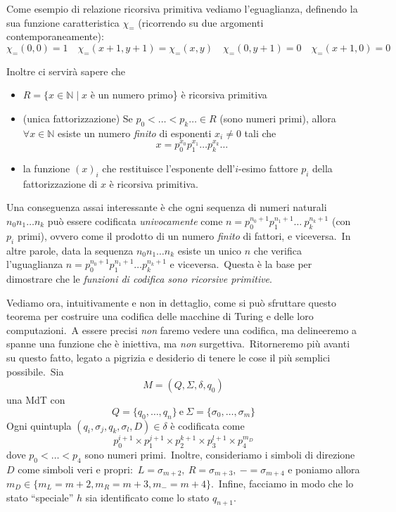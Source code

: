 \noindent Come esempio di relazione ricorsiva primitiva vediamo l'eguaglianza, definendo la sua funzione caratteristica $\chi_=$ (ricorrendo su due argomenti contemporaneamente):
\[\chi_=(0,0) = 1\quad \chi_=(x+1,y+1)=\chi_=(x,y)\quad \chi_=(0,y+1)=0\quad \chi_=(x+1,0)=0\]

\noindent Inoltre ci servirà sapere che
\begin{itemize}
    \itemsep0px
    \item $R=\{x \in \mathbb{N} \mid x $ è un numero primo\} è ricorsiva primitiva
    \item (unica fattorizzazione) Se $p_0 < \dots < p_k \dots \in R$ (sono numeri primi), allora $\forall x \in \mathbb{N}$ esiste un numero \textit{finito} di esponenti $x_i \neq 0$ tali che
          \[x=p_0^{x_0}p_1^{x_1}\dots p_k^{x_k}\dots \]
    \item la funzione $(x)_i$ che restituisce l'esponente dell'$i$-esimo fattore $p_i$ della fattorizzazione di $x$ è ricorsiva primitiva.
\end{itemize}

\newpage

\noindent Una conseguenza assai interessante è che ogni sequenza di numeri naturali $n_0n_1\dots n_k$ può essere codificata \textit{univocamente} come $n = p_0^{n_0 +1} p_1^{n_1 +1}\dots\ p_k^{n_k +1}$ (con $p_i$ primi), ovvero come il prodotto di un numero \textit{finito} di fattori, e viceversa.\
In altre parole, data la sequenza $n_0n_1\dots n_k$ esiste un unico $n$ che verifica l'uguaglianza $n = p_0^{n_0 +1} p_1^{n_1 +1}\dots p_k^{n_k +1}$ e viceversa.\
Questa è la base per dimostrare che le \textit{funzioni di codifica sono ricorsive primitive}.\

Vediamo ora, intuitivamente e non in dettaglio, come si può sfruttare questo teorema per costruire una codifica delle macchine di Turing e delle loro computazioni.\
A essere precisi \textit{non} faremo vedere una codifica, ma delineeremo a spanne una funzione che è iniettiva, ma \textit{non} surgettiva.\
Ritorneremo più avanti su questo fatto, legato a pigrizia e desiderio di tenere le cose il più semplici possibile.\
Sia
\[M = (Q, \Sigma, \delta, q_0)\]
una MdT con
\[Q = \{q_0,\dots, q_n\}\ \mathrm{e}\ \Sigma = \{\sigma_0, \dots, \sigma_m\}\]
Ogni quintupla $(q_i, \sigma_j, q_k, \sigma_l, D) \in \delta$ è codificata come
\[p_0^{i+1} \times p_1^{j+1} \times p_2^{k+1} \times p_3^{l+1} \times p_4^{m_D}\]
dove $p_0 < \dots < p_4$ sono numeri primi.\
Inoltre, consideriamo i simboli di direzione $D$ come simboli veri e propri:\ $L = \sigma_{m+2},\ R = \sigma_{m+3},\ - = \sigma_{m+4}$ e poniamo allora $m_D \in \{m_L = m+2, m_R = m+3, m_- = m + 4\}$.\
Infine, facciamo in modo che lo stato ``speciale'' $h$ sia identificato come lo stato $q_{n+1} $.\

